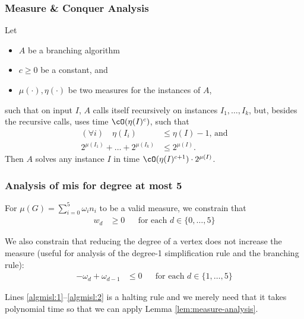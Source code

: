 \begin{frame}
	\frametitle{Measure \& Conquer Analysis}
	
	\begin{lemma}\label{lem:measure-analysis}
		Let
		\begin{itemize}
			\item $A$ be a branching algorithm
			\item $c \ge 0$ be a constant, and
			\item $\mu(\cdot), \eta(\cdot)$ be two measures
			for the instances of $A$,
		\end{itemize}
		such that
		on input $I$, $A$ calls itself recursively on instances $I_1,\ldots,I_k$, but, besides the recursive calls, uses time $\cO(\eta(I)^c)$, such that
		\begin{align}
		(\forall i) \quad \eta(I_i) & \leq \eta(I)-1 \text{, and}  \label{eq:masize}
		\\
		2^{\mu(I_1)} + \ldots + 2^{\mu(I_k)} & \leq 2^{\mu(I)} . \label{eq:magain}
		\end{align}
		Then $A$ solves any instance $I$
		in time $\cO(\eta(I)^{c+1}) \cdot 2^{\mu(I)}$.
	\end{lemma}
	
\end{frame}


\begin{frame}
 \frametitle{Analysis of mis for degree at most 5}
 
 For $\mu(G) = \sum_{i= 0}^5 \omega_i n_i$ to be a valid measure, we constrain that
 \begin{align*}
   w_d &\ge  0 && \text{for each }d\in\{0,\dots,5\}
 \end{align*}

 \medskip
 We also constrain that reducing the degree of a vertex does not increase the measure (useful for analysis of the degree-1 simplification rule and the branching rule):
 \begin{align*}
  	-\omega_d+\omega_{d-1} &\le  0 && \text{for each }d\in\{1,\dots,5\}
 \end{align*}

 \medskip
 \pause
 Lines \ref{algmisl:1}--\ref{algmisl:2} is a halting rule and we merely need that it takes polynomial time so that we can apply Lemma \ref{lem:measure-analysis}.


\end{frame}


